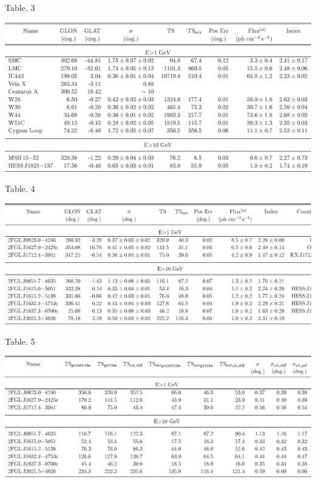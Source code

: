 \documentclass[12pt]{beamer}
\begin{document}
\begin{frame}{Table. 3}
  \begin{center}
    \includegraphics[scale=0.5]{tables/table3.eps}
  \end{center}
\end{frame}

\begin{frame}{Table. 4}
  \begin{center}
    \includegraphics[scale=0.5]{tables/table4.eps}
  \end{center}
\end{frame}

\begin{frame}{Table. 5}
  \begin{center}
    \includegraphics[scale=0.5]{tables/table5.eps}
  \end{center}
\end{frame}
\end{document}
